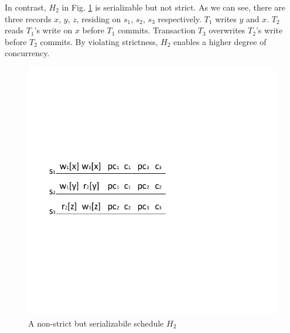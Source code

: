 \documentclass[conference]{IEEEtran}
\begin{document}
In contrast, ${H_2}$ in Fig. \ref{fig:non_strict_example} is serializable but not strict.
As we can see, there are three records ${x}$, ${y}$, ${z}$, residing on ${s_1}$, ${s_2}$, ${s_3}$ respectively.
${T_1}$ writes ${y}$ and ${x}$.
${T_2}$ reads ${T_1}$'s write on ${x}$ before ${T_1}$ commits.
Transaction ${T_3}$ overwrites ${T_2}$'s write before ${T_2}$ commits.
By violating strictness, ${H_2}$  enables a higher degree of concurrency.


\begin{figure}[tbp]
  \centerline{\includegraphics[scale=1]{schedule_non_strict.pdf}}
  \caption{A non-strict but serializabile schedule ${H_2}$}
  \label{fig:non_strict_example}
\end{figure}
\end{document}
